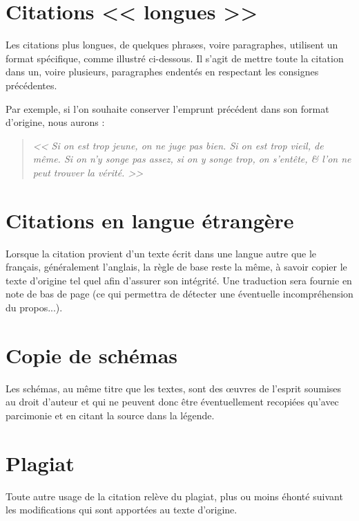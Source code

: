 \documentclass[11pt, french]{report-rd-info}
\begin{document}
\section{Citations << longues >>}

Les citations plus longues, de quelques phrases, voire paragraphes, utilisent un format spécifique, comme illustré ci-dessous. Il s'agit de mettre toute la citation dans un, voire plusieurs, paragraphes endentés en respectant les consignes précédentes.

Par exemple, si l'on souhaite conserver l'emprunt précédent dans son format d'origine, nous aurons :
\begin{quote}
	\emph{<< Si on est trop jeune, on ne juge pas bien. Si on est trop vieil, de même. Si on n'y songe pas assez, si on y songe trop, on s'entête, \& l'on ne peut trouver la vérité. >>} \cite{Pascal-1671}
\end{quote}

\section{Citations en langue étrangère}

Lorsque la citation provient d'un texte écrit dans une langue autre que le français, généralement l'anglais, la règle de base reste la même, à savoir copier le texte d'origine tel quel afin d'assurer son intégrité. Une traduction sera fournie en note de bas de page (ce qui permettra de détecter une éventuelle incompréhension du propos...).

\section{Copie de schémas}

Les schémas, au même titre que les textes, sont des \oe uvres de l'esprit soumises au droit d'auteur et qui ne peuvent donc être éventuellement recopiées qu'avec parcimonie et en citant la source dans la légende.

\section{Plagiat}
\label{ann:Plagiat}

Toute autre usage de la citation relève du plagiat, plus ou moins éhonté suivant les modifications qui sont apportées au texte d'origine.
\end{document}
